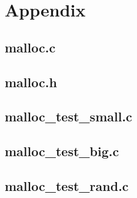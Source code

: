 \documentclass[paper=a4, fontsize=11pt]{scrartcl} %
\numberwithin{equation}{section} %
\numberwithin{figure}{section} %
\numberwithin{table}{section} %
\begin{document}





\newpage
\section*{Appendix}
\subsection*{malloc.c}


\newpage
\subsection*{malloc.h}


\newpage
\subsection*{malloc\_test\_small.c}


\newpage
\subsection*{malloc\_test\_big.c}


\newpage
\subsection*{malloc\_test\_rand.c}

\end{document}
